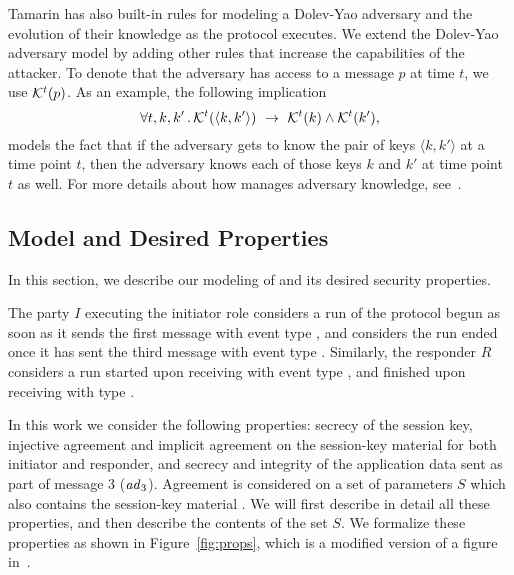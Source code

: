 \documentclass[runningheads]{llncs}
\begin{document}
Tamarin has also built-in rules for modeling a Dolev-Yao adversary and the
evolution of their knowledge as the protocol executes.
%
We extend the Dolev-Yao adversary model by adding other rules that increase
the capabilities of the attacker.
%
To denote that the adversary has access to a message $p$ at time $t$, we use 
$\mathcal{K}^{t}(p)$.
%
As an example, the following implication
\[
    \forall t, k, k'\operatorname{.} \mathcal{K}^{t}(\langle k, k'\rangle)\ \rightarrow\
\mathcal{K}^{t}(k) \land \mathcal{K}^{t}(k'),
\]
models the fact that if the adversary gets to know the pair of
keys $\langle k, k' \rangle$ at a time point $t$, then the adversary
knows each of those keys $k$ and $k'$ at time point $t$ as well.
%
For more details about how \mTamarin{} manages adversary knowledge,
see~\cite{DBLP:conf/cav/MeierSCB13}.
%

\subsection{Model and Desired Properties}
\label{sec:desired-properties}
In this section, we describe our modeling of \mEdhoc{} and its desired
security properties.
%

The party $I$ executing the initiator role considers a run of the protocol
begun as soon as it sends the first message \mMsgone{} with event type
\mIStart, and considers the run ended once it has sent the third message
\mMsgthree{} with event type \mIComplete.
%
Similarly, the responder $R$ considers a run started upon receiving 
\mMsgone{}
with event type \mRStart, and finished upon receiving \mMsgthree{} with 
type
\mRComplete.
%

In this work we consider the following properties: secrecy of the session key,
injective agreement and implicit agreement on the session-key material for 
both
initiator and responder, and secrecy and integrity of the application data sent
as part of message 3 ($\mathit{ad}_3$).
%
Agreement is considered on a set of parameters $S$ which also contains the
session-key material \mSessKey{}.
%
We will first describe in detail all these properties, and then describe the
contents of the set $S$.
%
We formalize these properties as shown in Figure~\ref{fig:props}, which is
a modified version of a figure in~\cite{Norr21}.
%
\end{document}

